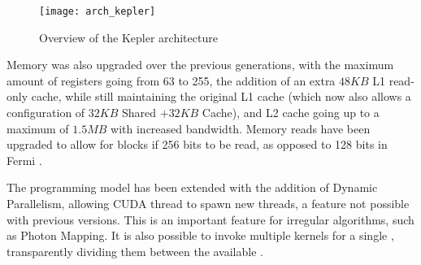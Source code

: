 \documentclass[main.tex]{subfiles}
\begin{document}
\begin{figure}
  \centering
  \texttt{[image: arch\_kepler]}
  \caption{Overview of the Kepler architecture \label{fig:kepler}}
\end{figure}

Memory was also upgraded over the previous generations, with the maximum amount of registers going from 63 to 255, the addition of an extra $48KB$ L1 read-only cache, while still maintaining the original L1 cache (which now also allows a configuration of $32KB$ Shared $+ 32KB$ Cache), and L2 cache going up to a maximum of $1.5MB$ with increased bandwidth. Memory reads have been upgraded to allow for blocks if 256 bits to be read, as opposed to 128 bits in Fermi \cite{NVIDIA:kepler}.

The programming model has been extended with the addition of Dynamic Parallelism, allowing \acs{CUDA} thread to spawn new threads, a feature not possible with previous versions. This is an important feature for irregular algorithms, such as Photon Mapping. It is also possible to invoke multiple kernels for a single \gpu, transparently dividing them between the available \smxs.
\end{document}
